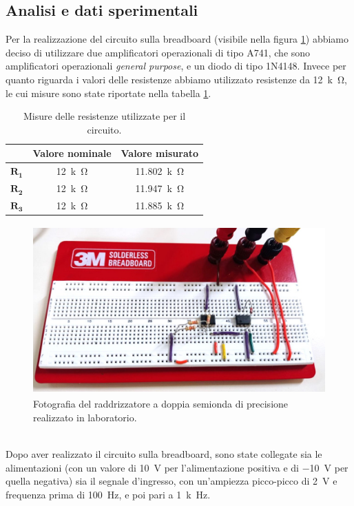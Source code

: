 \documentclass{report}
\begin{document}
\subsection{Analisi e dati sperimentali}
Per la realizzazione del circuito sulla breadboard (visibile nella figura \ref{figura:circuito1}) abbiamo deciso di utilizzare due amplificatori operazionali di tipo \textmu A741, che sono amplificatori operazionali \textit{general purpose}, e un diodo di tipo 1N4148.
Invece per quanto riguarda i valori delle resistenze abbiamo utilizzato resistenze da \SI{12}{k\ohm}, le cui misure sono state riportate nella tabella \ref{table:mis_res1}.
\begin{table}[h!]
	\centering
	\begin{tabular}{|c|c|c|}
		\cline{2-3} 
		\multicolumn{1}{c|}{} & \textbf{Valore nominale} & \textbf{Valore misurato}\\ 
		\hline
		$\mathbf{R_1}$ & \SI{12}{k\ohm} & \SI{11.802}{k\ohm} \\ 
		\hline
		$\mathbf{R_2}$ & \SI{12}{k\ohm} & \SI{11.947}{k\ohm} \\ 
		\hline
		$\mathbf{R_3}$ & \SI{12}{k\ohm} & \SI{11.885}{k\ohm} \\ 
		\hline
	\end{tabular}
	\caption{Misure delle resistenze utilizzate per il circuito.}
	\label{table:mis_res1}
\end{table}
\begin{figure}[h]
	\centering
	\includegraphics[height=6.5cm]{immagini/circuito1}
	\caption{Fotografia del raddrizzatore a doppia semionda di precisione realizzato in laboratorio.}
	\label{figura:circuito1}
\end{figure}
\\\indent Dopo aver realizzato il circuito sulla breadboard, sono state collegate sia le alimentazioni (con un valore di \SI{+10}{\volt} per l'alimentazione positiva e di \SI{-10}{\volt} per quella negativa) sia il segnale d'ingresso, con un'ampiezza picco-picco di \SI{2}{\volt} e frequenza prima di  \SI{100}{\hertz},  e poi pari a \SI{1}{k\hertz}.\par
\end{document}
